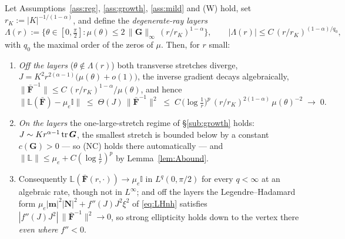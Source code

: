 \begin{lemma}
    \label{lem:screen}
    Let Assumptions~\ref{ass:reg}, \ref{ass:growth}, \ref{ass:mild} and (W) hold, set
    $r_K:=|K|^{-1/(1-\alpha)}$, and define the \emph{degenerate-ray layers}
    \begin{equation}
        \label{eq:layers}
        \Lambda(r):=\Big\{\theta\in[0,\tfrac\pi2] : \mu(\theta)\le 2\,\|\bm{G}\|_\infty\,(r/r_K)^{1-\alpha}\Big\},
        \qquad |\Lambda(r)|\le C\,(r/r_K)^{(1-\alpha)/q_0},
    \end{equation}
    with $q_0$ the maximal order of the zeros of $\mu$. Then, for $r$ small:
    \begin{enumerate}
        \item[\textup{(i)}] \emph{Off the layers} ($\theta\notin\Lambda(r)$) both transverse stretches diverge,
              $J= K^2r^{2(\alpha-1)}\big(\mu(\theta)+o(1)\big)$, the inverse gradient decays algebraically,
              $\|\bar{\bm{F}}^{-1}\|\le C\,(r/r_K)^{1-\alpha}/\mu(\theta)$, and hence
              \begin{equation}
                  \label{eq:screen}
                  \big\|\mathbb{L}(\bar{\bm{F}})-\mu_e\mathbb{I}\big\|
                  \;\le\; \Theta(J)\,\|\bar{\bm{F}}^{-1}\|^2
                  \;\le\; C\,\big(\log\tfrac1r\big)^{p}\,(r/r_K)^{2(1-\alpha)}\,\mu(\theta)^{-2}\;\longrightarrow\;0 .
              \end{equation}
        \item[\textup{(ii)}] \emph{On the layers} the one-large-stretch regime of \S\ref{sub:growth} holds:
              $J\sim K r^{\alpha-1}\operatorname{tr}\bm{G}$, the smallest stretch is bounded below by a constant $c(\bm{G})>0$ ---
              so (NC) holds there automatically --- and $\|\mathbb{L}\|\le\mu_e+C(\log\tfrac1r)^p$ by
              Lemma~\ref{lem:Abound}.
        \item[\textup{(iii)}] Consequently $\mathbb{L}(\bar{\bm{F}}(r,\cdot))\to\mu_e\mathbb{I}$ in $L^q(0,\pi/2)$ for
              every $q<\infty$ at an algebraic rate, though not in $L^\infty$; and off the layers the
              Legendre--Hadamard form $\mu_e|\bm m|^2|\bm N|^2+f''(J)J^2\xi^2$ of \eqref{eq:LHnh} satisfies
              $|f''(J)J^2|\,\|\bar{\bm{F}}^{-1}\|^2\to0$, so strong ellipticity holds down to the vertex there
              \emph{even where} $f''<0$.
    \end{enumerate}
\end{lemma}

